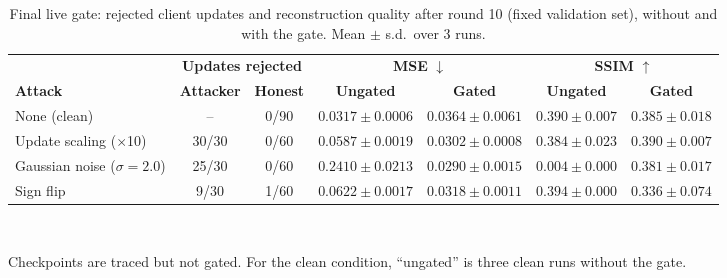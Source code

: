 \begin{table}[!t]
\centering
\caption{Final live gate: rejected client updates and reconstruction quality after round 10 (fixed validation set), without and with the gate. Mean $\pm$ s.d.\ over 3 runs.}
\label{tab:enforcement}
\footnotesize
\setlength{\tabcolsep}{4pt}
\begin{tabular}{@{}lcccccc@{}}
\toprule
& \multicolumn{2}{c}{\textbf{Updates rejected}} & \multicolumn{2}{c}{\textbf{MSE} $\downarrow$} & \multicolumn{2}{c}{\textbf{SSIM} $\uparrow$} \\ \cmidrule(lr){2-3}\cmidrule(lr){4-5}\cmidrule(lr){6-7}
\textbf{Attack} & \textbf{Attacker} & \textbf{Honest} & \textbf{Ungated} & \textbf{Gated} & \textbf{Ungated} & \textbf{Gated} \\
\midrule
None (clean) & -- & 0/90 & $0.0317 \pm 0.0006$ & $0.0364 \pm 0.0061$ & $0.390 \pm 0.007$ & $0.385 \pm 0.018$ \\
Update scaling ($\times$10) & 30/30 & 0/60 & $0.0587 \pm 0.0019$ & $0.0302 \pm 0.0008$ & $0.384 \pm 0.023$ & $0.390 \pm 0.007$ \\
Gaussian noise ($\sigma{=}2.0$) & 25/30 & 0/60 & $0.2410 \pm 0.0213$ & $0.0290 \pm 0.0015$ & $0.004 \pm 0.000$ & $0.381 \pm 0.017$ \\
Sign flip & 9/30 & 1/60 & $0.0622 \pm 0.0017$ & $0.0318 \pm 0.0011$ & $0.394 \pm 0.000$ & $0.336 \pm 0.074$ \\
\bottomrule
\end{tabular}
\\[2pt]
\parbox{\textwidth}{\scriptsize Checkpoints are traced but not gated. For the clean condition, ``ungated'' is three clean runs without the gate.}
\end{table}
